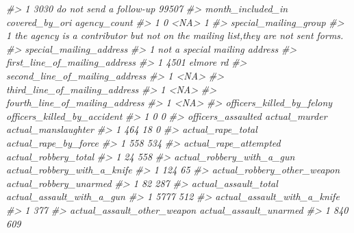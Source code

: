 \documentclass[
]{krantz}
\makeatletter
\newenvironment{Shaded}{\begin{snugshade}}{\end{snugshade}}
\newcommand{\CommentTok}[1]{\textcolor[rgb]{0.37,0.37,0.37}{\textit{#1}}}
\newenvironment{kframe}{%
\medskip{}
\setlength{\fboxsep}{.8em}
 \def\at@end@of@kframe{}%
 \ifinner\ifhmode%
  \def\at@end@of@kframe{\end{minipage}}%
  \begin{minipage}{\columnwidth}%
 \fi\fi%
 \def\FrameCommand##1{\hskip\@totalleftmargin \hskip-\fboxsep
 \colorbox{shadecolor}{##1}\hskip-\fboxsep
     \hskip-\linewidth \hskip-\@totalleftmargin \hskip\columnwidth}%
 \MakeFramed {\advance\hsize-\width
   \@totalleftmargin\z@ \linewidth\hsize
   \@setminipage}}%
 {\par\unskip\endMakeFramed%
 \at@end@of@kframe}
\renewenvironment{Shaded}{\begin{kframe}}{\end{kframe}}
\makeatother
\begin{document}
\begin{Shaded}
\begin{Highlighting}[]
\CommentTok{\#\textgreater{} 1             3030 do not send a follow{-}up    99507}
\CommentTok{\#\textgreater{}   month\_included\_in covered\_by\_ori agency\_count}
\CommentTok{\#\textgreater{} 1                 0           \textless{}NA\textgreater{}            1}
\CommentTok{\#\textgreater{}                                                              special\_mailing\_group}
\CommentTok{\#\textgreater{} 1 the agency is a contributor but not on the mailing list,they are not sent forms.}
\CommentTok{\#\textgreater{}         special\_mailing\_address}
\CommentTok{\#\textgreater{} 1 not a special mailing address}
\CommentTok{\#\textgreater{}   first\_line\_of\_mailing\_address}
\CommentTok{\#\textgreater{} 1                4501 elmore rd}
\CommentTok{\#\textgreater{}   second\_line\_of\_mailing\_address}
\CommentTok{\#\textgreater{} 1                           \textless{}NA\textgreater{}}
\CommentTok{\#\textgreater{}   third\_line\_of\_mailing\_address}
\CommentTok{\#\textgreater{} 1                          \textless{}NA\textgreater{}}
\CommentTok{\#\textgreater{}   fourth\_line\_of\_mailing\_address}
\CommentTok{\#\textgreater{} 1                           \textless{}NA\textgreater{}}
\CommentTok{\#\textgreater{}   officers\_killed\_by\_felony officers\_killed\_by\_accident}
\CommentTok{\#\textgreater{} 1                         0                           0}
\CommentTok{\#\textgreater{}   officers\_assaulted actual\_murder actual\_manslaughter}
\CommentTok{\#\textgreater{} 1                464            18                   0}
\CommentTok{\#\textgreater{}   actual\_rape\_total actual\_rape\_by\_force}
\CommentTok{\#\textgreater{} 1               558                  534}
\CommentTok{\#\textgreater{}   actual\_rape\_attempted actual\_robbery\_total}
\CommentTok{\#\textgreater{} 1                    24                  558}
\CommentTok{\#\textgreater{}   actual\_robbery\_with\_a\_gun actual\_robbery\_with\_a\_knife}
\CommentTok{\#\textgreater{} 1                       124                          65}
\CommentTok{\#\textgreater{}   actual\_robbery\_other\_weapon actual\_robbery\_unarmed}
\CommentTok{\#\textgreater{} 1                          82                    287}
\CommentTok{\#\textgreater{}   actual\_assault\_total actual\_assault\_with\_a\_gun}
\CommentTok{\#\textgreater{} 1                 5777                       512}
\CommentTok{\#\textgreater{}   actual\_assault\_with\_a\_knife}
\CommentTok{\#\textgreater{} 1                         377}
\CommentTok{\#\textgreater{}   actual\_assault\_other\_weapon actual\_assault\_unarmed}
\CommentTok{\#\textgreater{} 1                         840                    609}

\end{Highlighting}
\end{Shaded}
\end{document}
